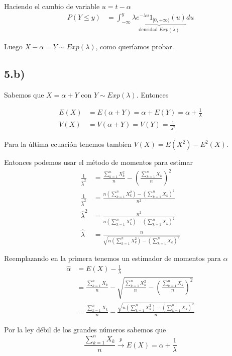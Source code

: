 \documentclass[a4paper,10pt]{article}
\begin{document}
Haciendo el cambio de variable $u = t - \alpha$
\[
\begin{align*}
P(Y \le y) 
&= \int_{-\infty}^{y} \underbrace{\lambda e^{-\lambda u} 1_{[0, +\infty)}(u)}_{\text{densidad }Exp(\lambda)} du
\end{align*}
\]

Luego $X - \alpha = Y \sim Exp(\lambda)$, como queríamos probar.

\subsection*{5.b)}

Sabemos que $X = \alpha + Y$ con $Y \sim Exp(\lambda)$. Entonces

\[
\begin{align*}
E(X) &= E(\alpha + Y) = \alpha + E(Y) = \alpha + \frac{1}{\lambda} \\
V(X) &= V(\alpha + Y) = V(Y) = \frac{1}{\lambda^2}
\end{align*}
\]

Para la última ecuación tenemos tambien $V(X) = E(X^2) - E^2(X)$.

Entonces podemos usar el método de momentos para estimar
\[
\begin{align*}
\frac{1}{\hat\lambda^2} &= \frac{\sum_{k=1}^n X_k^2}{n} - \left(\frac{\sum_{k=1}^n X_k}{n}\right)^2 \\
\frac{1}{\hat\lambda^2} &= \frac{n(\sum_{k=1}^n X_k^2) - (\sum_{k=1}^n X_k)^2}{n^2} \\
\hat\lambda^2 &= \frac{n^2}{n(\sum_{k=1}^n X_k^2) - (\sum_{k=1}^n X_k)^2} \\
\hat\lambda &= \frac{n}{\sqrt{n(\sum_{k=1}^n X_k^2) - (\sum_{k=1}^n X_k)^2}}
\end{align*}
\]

Reemplazando en la primera tenemos un estimador de momentos para $\alpha$
\[
\begin{align*}
\hat\alpha &= E(X) - \frac{1}{\lambda} \\
&= \frac{\sum_{k=1}^n X_k}{n} - \sqrt{\frac{\sum_{k=1}^n X_k^2}{n}  - \left(\frac{\sum_{k=1}^n X_k}{n}\right)^2} \\
&= \frac{\sum_{k=1}^n X_k}{n} - \frac{\sqrt{n(\sum_{k=1}^n X_k^2) - (\sum_{k=1}^n X_k)^2}}{n} 
\end{align*}
\]

Por la ley débil de los grandes números sabemos que 
\[
\frac{\sum_{k=1}^n X_k}{n} \overset{p}{\rightarrow} E(X) = \alpha + \frac{1}{\lambda}
\]
\end{document}
